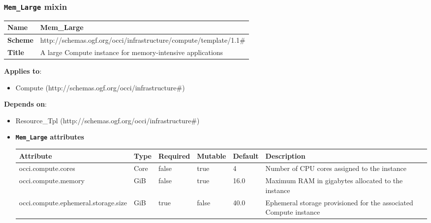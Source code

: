 \subsubsection{\texttt{Mem\_Large} mixin}
\begin{center}
\begin{tabular}{|l|l|}
  \hline
  \textbf{Name} & Mem\_Large \\
  \hline  
  \textbf{Scheme} & http://schemas.ogf.org/occi/infrastructure/compute/template/1.1\# \\
  \hline
  \textbf{Title} & A large Compute instance for memory-intensive applications \\
  \hline
\end{tabular}
\end{center}
\textbf{Applies to}:
\begin{itemize}
	\item Compute (http://schemas.ogf.org/occi/infrastructure\#)
\end{itemize}
\textbf{Depends on}:
\begin{itemize}
	\item Resource\_Tpl (http://schemas.ogf.org/occi/infrastructure\#)
\end{itemize}

\begin{itemize}
\item \textbf{\texttt{Mem\_Large} attributes}

\begin{tabularx}{\textwidth}{|l|l|p{1.4cm}|p{1.3cm}|l|X|}
  \hline
  \textbf{Attribute} & \textbf{Type} & \textbf{Required} & \textbf{Mutable} & \textbf{Default} & \textbf{Description} \\
  \hline  
  occi.compute.cores & Core & false & true & 4 & Number of CPU cores assigned to the instance \\
  \hline
  occi.compute.memory & GiB & false & true & 16.0 & Maximum RAM in gigabytes allocated to the instance \\
  \hline
  occi.compute.ephemeral.storage.size & GiB & true & false & 40.0 & Ephemeral storage provisioned for the associated Compute instance \\
  \hline
\end{tabularx}
\end{itemize}


